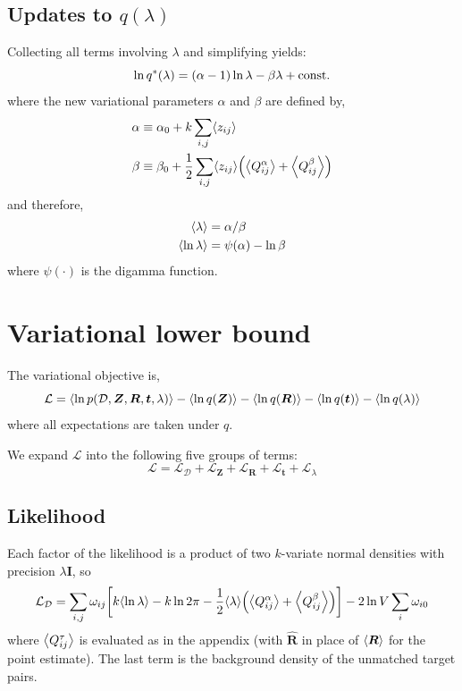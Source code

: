 \documentclass{article}
\newcommand{\lh}{\mathopen{}\mathclose\bgroup\left}
\newcommand{\rh}{\aftergroup\egroup\right}
\newcommand{\E}[1]{\lh\langle #1 \rh\rangle}
\newcommand{\m}[1]{\boldsymbol{#1}}
\newcommand{\setD}{\mathcal{D}}
\newcommand{\const}{\mathrm{const.}}
\begin{document}
\subsection{Updates to $q(\lambda)$}
Collecting all terms involving $\lambda$ and simplifying yields:
\begin{equation}
\ln q^*(\lambda) =
 \lh( \alpha - 1 \rh) \ln \lambda - \beta \lambda
 +\const{}
\end{equation}
where the new variational parameters $\alpha$ and $\beta$ are defined by,
\begin{equation}
\begin{aligned}
\alpha &\equiv \alpha_0 + k \sum_{i,j} \E{z_{ij}}
\\
\beta &\equiv
 \beta_0 + \frac{1}{2} \sum_{i,j} \E{z_{ij}} \lh(
  \E{Q_{ij}^\alpha} + \E{Q_{ij}^\beta}
 \rh)
\end{aligned}
\end{equation}
and therefore,
\begin{equation}
\begin{aligned}
\E{\lambda} &= \alpha / \beta
\\
\E{\ln \lambda} &= \psi(\alpha) - \ln \beta
\end{aligned}
\end{equation}
where $\psi(\cdot)$ is the digamma function.

\clearpage
\section{Variational lower bound}
\label{sec:bound}
The variational objective is,
\begin{equation}
\mathcal{L} =
 \E{\ln p(\setD, \m{Z}, \m{R}, \m{t}, \lambda)}
 - \E{\ln q(\m{Z})}
 - \E{\ln q(\m{R})}
 - \E{\ln q(\m{t})}
 - \E{\ln q(\lambda)}
\end{equation}
where all expectations are taken under $q$.

We expand $\mathcal{L}$ into the following five groups of terms:
\begin{equation}
\mathcal{L} =
 \mathcal{L}_{\setD}
 + \mathcal{L}_{\m{Z}}
 + \mathcal{L}_{\m{R}}
 + \mathcal{L}_{\m{t}}
 + \mathcal{L}_{\lambda}
\end{equation}

\subsection{Likelihood}
Each factor of the likelihood is a product of two $k$-variate normal
densities with precision $\lambda \m{I}$, so
\begin{equation}
\mathcal{L}_{\setD} =
 \sum_{i,j} \omega_{ij} \lh[
   k \E{\ln \lambda}
   - k \ln 2\pi
   - \frac{1}{2} \E{\lambda}
     \lh( \E{Q_{ij}^\alpha} + \E{Q_{ij}^\beta} \rh)
 \rh]
 - 2 \ln V \sum_i \omega_{i0}
\end{equation}
where $\E{Q_{ij}^\tau}$ is evaluated as in the appendix
(with $\hat{\m{R}}$ in place of $\E{\m{R}}$ for the point estimate).
The last term is the background density of the unmatched target pairs.
\end{document}

